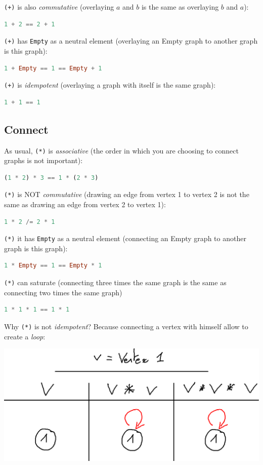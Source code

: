 \documentclass[10pt,a4paper]{article}
\begin{document}
\verb|(+)| is also \emph{commutative} (overlaying $a$ and $b$ is the same as overlaying $b$ and $a$):
\begin{lstlisting}[language=Haskell, frame=single]
1 + 2 == 2 + 1
\end{lstlisting}

\verb|(+)| has \verb|Empty| as a neutral element (overlaying an Empty graph to another graph is this graph):
\begin{lstlisting}[language=Haskell, frame=single]
1 + Empty == 1 == Empty + 1
\end{lstlisting}

\verb|(+)| is \emph{idempotent} (overlaying a graph with itself is the same graph):
\begin{lstlisting}[language=Haskell, frame=single]
1 + 1 == 1
\end{lstlisting}

\subsection{Connect}
As usual, \verb|(*)| is \emph{associative} (the order in which you are choosing to connect graphs is not important):
\begin{lstlisting}[language=Haskell, frame=single]
(1 * 2) * 3 == 1 * (2 * 3)
\end{lstlisting}

\verb|(*)| is NOT \emph{commutative} (drawing an edge from vertex 1 to vertex 2 is not the same as drawing an edge from vertex 2 to vertex 1):
\begin{lstlisting}[language=Haskell, frame=single]
1 * 2 /= 2 * 1
\end{lstlisting}

\verb|(*)| it has \verb|Empty| as a neutral element (connecting an Empty graph to another graph is this graph):
\begin{lstlisting}[language=Haskell, frame=single]
1 * Empty == 1 == Empty * 1
\end{lstlisting}

\verb|(*)| can saturate (connecting three times the same graph is the same as connecting two times the same graph)
\begin{lstlisting}[language=Haskell, frame=single]
1 * 1 * 1 == 1 * 1
\end{lstlisting}

Why \verb|(*)| is not \emph{idempotent}? Because connecting a vertex with himself allow to create a \emph{loop}:

\begin{center}
	\includegraphics[scale=0.5]{figspng/saturate.png}
\end{center}
\end{document}
